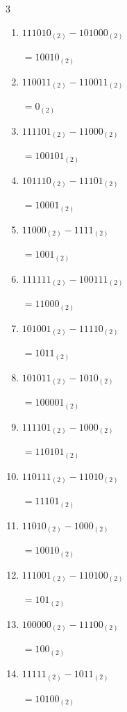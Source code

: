 \begin{multicols}{3}
\begin{enumerate}
  \item $111010_{(2)} - 101000_{(2)}$

        $=10010_{(2)}$

  \item $110011_{(2)} - 110011_{(2)}$

        $=0_{(2)}$

  \item $111101_{(2)} - 11000_{(2)}$

        $=100101_{(2)}$

  \item $101110_{(2)} - 11101_{(2)}$

        $=10001_{(2)}$

  \item $11000_{(2)} - 1111_{(2)}$

        $=1001_{(2)}$

  \item $111111_{(2)} - 100111_{(2)}$

        $=11000_{(2)}$

  \item $101001_{(2)} - 11110_{(2)}$

        $=1011_{(2)}$

  \item $101011_{(2)} - 1010_{(2)}$

        $=100001_{(2)}$

  \item $111101_{(2)} - 1000_{(2)}$

        $=110101_{(2)}$

  \item $110111_{(2)} - 11010_{(2)}$

        $=11101_{(2)}$

\columnbreak %

\resetques

  \item $11010_{(2)} - 1000_{(2)}$

        $=10010_{(2)}$

  \item $111001_{(2)} - 110100_{(2)}$

        $=101_{(2)}$

  \item $100000_{(2)} - 11100_{(2)}$

        $=100_{(2)}$

  \item $11111_{(2)} - 1011_{(2)}$

        $=10100_{(2)}$


\end{enumerate}
\end{multicols}
